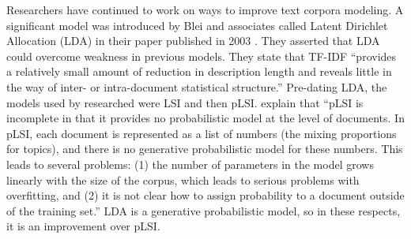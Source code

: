 Researchers have continued to work on ways to improve text corpora modeling. A significant model was introduced by Blei and associates called Latent Dirichlet Allocation (LDA) in their paper published in 2003 \citep{Blei:2003:LDA:944919.944937}. They asserted that LDA could overcome weakness in previous models. They state that TF-IDF ``provides a relatively small amount of reduction in description length and reveals little in the way of inter- or intra-document statistical structure.'' Pre-dating LDA, the models used by researched were LSI and then pLSI. \citeauthor{Blei:2003:LDA:944919.944937} explain that ``pLSI is incomplete in that it provides no probabilistic model at the level of documents. In pLSI, each document is represented as a list of numbers (the mixing proportions for topics), and there is no generative probabilistic model for these numbers. This leads to several problems: (1) the number of parameters in the model grows linearly with the size of the corpus, which leads to serious problems with overfitting, and (2) it is not clear how to assign probability to a document outside of the training set.'' LDA is a generative probabilistic model, so in these respects, it is an improvement over pLSI.
